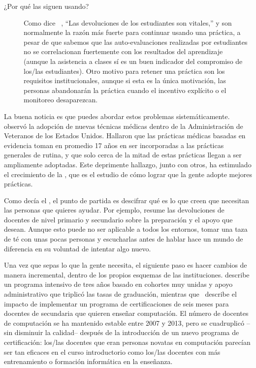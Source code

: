 \begin{description}
\item[¿Por qué las siguen usando?]

Como dice ~\cite{Bark2015}, ``Las devoluciones de los estudiantes son vitales,''
y son normalmente la razón más fuerte para continuar usando una práctica,
a pesar de que sabemos que las auto-evaluaciones realizadas por estudiantes 
no se correlacionan fuertemente con los resultados del aprendizaje~\cite{Star2014,Uttl2017}
(aunque la asistencia a clases sí es un buen indicador del compromiso de los/las estudiantes).
Otro motivo para retener una práctica son los requisitos institucionales,
aunque si esta es la única motivación,
las personas abandonarán la práctica 
cuando el incentivo explícito o el monitoreo desaparezcan.

\end{description}

La buena noticia es que puedes abordar estos problemas sistemáticamente.
\cite{Baue2015} observó  la adopción de nuevas técnicas médicas dentro de la Administración de Veteranos de los Estados Unidos. 
Hallaron que las prácticas médicas basadas en evidencia
toman en promedio 17 años en ser incorporadas a las prácticas generales de rutina,
y que solo cerca de la mitad de estas prácticas llegan a ser ampliamente adoptadas.
Este deprimente hallazgo, junto con otros, ha estimulado el crecimiento de la
,
que es el estudio de cómo lograr que la gente adopte mejores prácticas.

Como decía el ,
el punto de partida es descifrar qué es lo que creen que necesitan las personas que quieres ayudar.
Por ejemplo, \cite{Yada2016} resume las devoluciones de docentes de nivel primario y secundario sobre la preparación y el apoyo que desean.
Aunque esto puede no ser aplicable a todos los entornos,
tomar una taza de té con unas pocas personas y escucharlas antes de hablar
hace un mundo de diferencia en su voluntad de intentar algo nuevo. 

Una vez que sepas lo que la gente necesita,
el siguiente paso es hacer cambios de manera incremental,
dentro de los propios esquemas de las instituciones.
\cite{Nara2018} describe un programa intensivo de tres años
basado en cohortes muy unidas y apoyo administrativo
que triplicó las tasas de graduación,
mientras que~\cite{Hu2017} describe el impacto de implementar un programa de certificaciones de seis meses para docentes de secundaria que quieren enseñar computación.
El  número de docentes de computación se ha mantenido estable entre 2007 y 2013,
pero se cuadruplicó --sin disminuir la calidad-- después de la introducción de un nuevo programa de certificación:
los/las docentes que eran personas novatas en computación parecían ser tan eficaces en el curso introductorio como los/las docentes con más entrenamiento o formación informática en la enseñanza.


